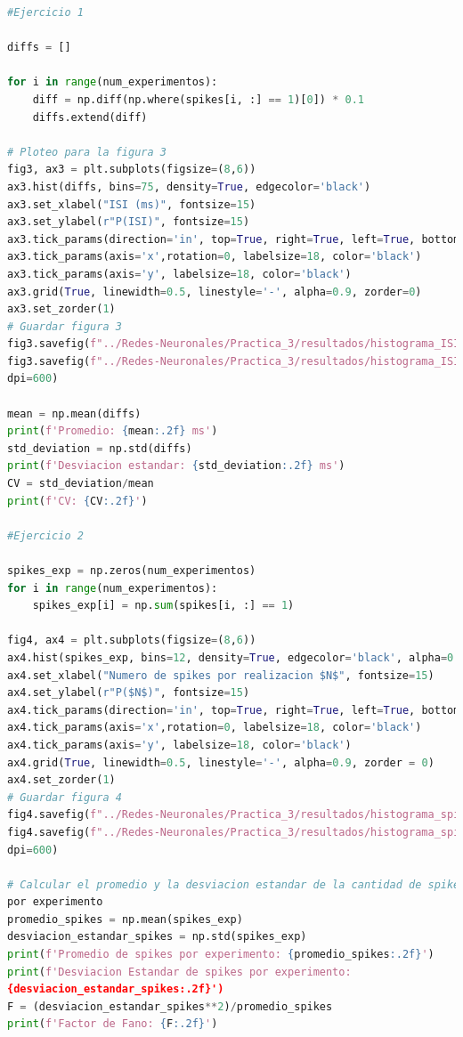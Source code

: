 \documentclass[11pt,twocolumn,twoside]{opticajnl}
\begin{document}
\begin{onecolumn}
\begin{lstlisting}[language=Python, caption={Implementación del método Runge-Kutta 4.}, label=python-code]
#Ejercicio 1

diffs = []

for i in range(num_experimentos):
    diff = np.diff(np.where(spikes[i, :] == 1)[0]) * 0.1
    diffs.extend(diff)

# Ploteo para la figura 3
fig3, ax3 = plt.subplots(figsize=(8,6)) 
ax3.hist(diffs, bins=75, density=True, edgecolor='black')
ax3.set_xlabel("ISI (ms)", fontsize=15)
ax3.set_ylabel(r"P(ISI)", fontsize=15)
ax3.tick_params(direction='in', top=True, right=True, left=True, bottom=True)
ax3.tick_params(axis='x',rotation=0, labelsize=18, color='black')
ax3.tick_params(axis='y', labelsize=18, color='black')
ax3.grid(True, linewidth=0.5, linestyle='-', alpha=0.9, zorder=0)
ax3.set_zorder(1)
# Guardar figura 3
fig3.savefig(f"../Redes-Neuronales/Practica_3/resultados/histograma_ISI.pdf")
fig3.savefig(f"../Redes-Neuronales/Practica_3/resultados/histograma_ISI.png",
dpi=600)

mean = np.mean(diffs)
print(f'Promedio: {mean:.2f} ms')
std_deviation = np.std(diffs)
print(f'Desviacion estandar: {std_deviation:.2f} ms')
CV = std_deviation/mean 
print(f'CV: {CV:.2f}')

#Ejercicio 2

spikes_exp = np.zeros(num_experimentos)
for i in range(num_experimentos):
    spikes_exp[i] = np.sum(spikes[i, :] == 1)

fig4, ax4 = plt.subplots(figsize=(8,6)) 
ax4.hist(spikes_exp, bins=12, density=True, edgecolor='black', alpha=0.7)
ax4.set_xlabel("Numero de spikes por realizacion $N$", fontsize=15)
ax4.set_ylabel(r"P($N$)", fontsize=15)
ax4.tick_params(direction='in', top=True, right=True, left=True, bottom=True)
ax4.tick_params(axis='x',rotation=0, labelsize=18, color='black')
ax4.tick_params(axis='y', labelsize=18, color='black')
ax4.grid(True, linewidth=0.5, linestyle='-', alpha=0.9, zorder = 0)
ax4.set_zorder(1)
# Guardar figura 4
fig4.savefig(f"../Redes-Neuronales/Practica_3/resultados/histograma_spikes.pdf")
fig4.savefig(f"../Redes-Neuronales/Practica_3/resultados/histograma_spikes.png",
dpi=600)

# Calcular el promedio y la desviacion estandar de la cantidad de spikes 
por experimento
promedio_spikes = np.mean(spikes_exp)
desviacion_estandar_spikes = np.std(spikes_exp)
print(f'Promedio de spikes por experimento: {promedio_spikes:.2f}')
print(f'Desviacion Estandar de spikes por experimento:
{desviacion_estandar_spikes:.2f}')
F = (desviacion_estandar_spikes**2)/promedio_spikes
print(f'Factor de Fano: {F:.2f}')


\end{lstlisting}
\end{onecolumn}
\end{document}
